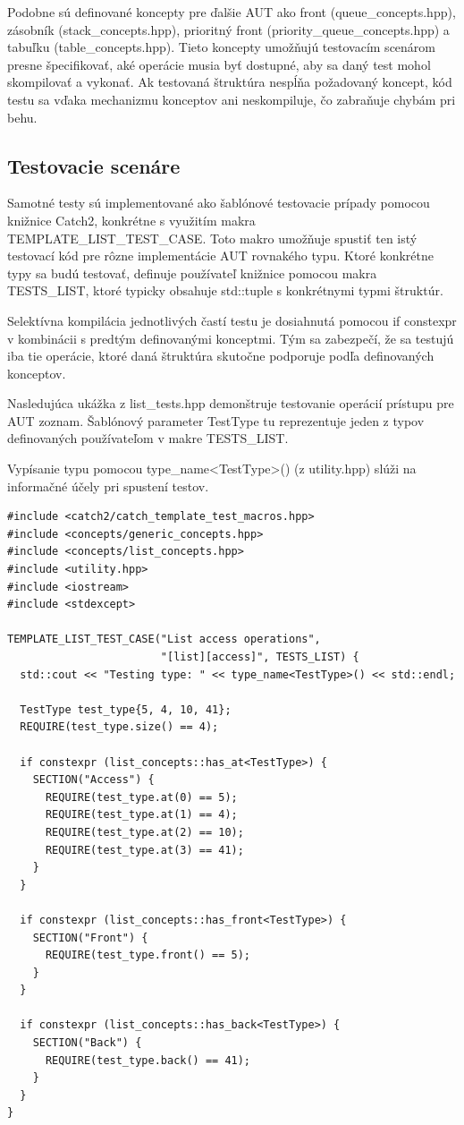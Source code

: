 \documentclass[11pt]{article}
\begin{document}
Podobne sú definované koncepty pre ďalšie AUT ako front (queue\_concepts.hpp), zásobník (stack\_concepts.hpp), prioritný front (priority\_queue\_concepts.hpp) a tabuľku (table\_concepts.hpp). Tieto koncepty umožňujú testovacím scenárom presne špecifikovať, aké operácie musia byť dostupné, aby sa daný test mohol skompilovať a vykonať. Ak testovaná štruktúra nespĺňa požadovaný koncept, kód testu sa vďaka mechanizmu konceptov ani neskompiluje, čo zabraňuje chybám pri behu.

\subsection{Testovacie scenáre}

Samotné testy sú implementované ako šablónové testovacie prípady pomocou knižnice Catch2, konkrétne s využitím makra TEMPLATE\_LIST\_TEST\_CASE. Toto makro umožňuje spustiť ten istý testovací kód pre rôzne implementácie AUT rovnakého typu. Ktoré konkrétne typy sa budú testovať, definuje používateľ knižnice pomocou makra TESTS\_LIST, ktoré typicky obsahuje std::tuple s konkrétnymi typmi štruktúr.

Selektívna kompilácia jednotlivých častí testu je dosiahnutá pomocou if constexpr v kombinácii s predtým definovanými konceptmi. Tým sa zabezpečí, že sa testujú iba tie operácie, ktoré daná štruktúra skutočne podporuje podľa definovaných konceptov.

Nasledujúca ukážka z list\_tests.hpp demonštruje testovanie operácií prístupu pre AUT zoznam. Šablónový parameter TestType tu reprezentuje jeden z typov definovaných používateľom v makre TESTS\_LIST.

Vypísanie typu pomocou type\_name<TestType>() (z utility.hpp) slúži na informačné účely pri spustení testov.

\begin{lstlisting}[caption={Ukážka testovacieho scenára pre Zoznam (list\_tests.hpp)}, label={lst:list_test_example}]
#include <catch2/catch_template_test_macros.hpp>
#include <concepts/generic_concepts.hpp>
#include <concepts/list_concepts.hpp>
#include <utility.hpp>
#include <iostream>
#include <stdexcept>

TEMPLATE_LIST_TEST_CASE("List access operations",
                        "[list][access]", TESTS_LIST) {
  std::cout << "Testing type: " << type_name<TestType>() << std::endl;

  TestType test_type{5, 4, 10, 41};
  REQUIRE(test_type.size() == 4);

  if constexpr (list_concepts::has_at<TestType>) {
    SECTION("Access") {
      REQUIRE(test_type.at(0) == 5);
      REQUIRE(test_type.at(1) == 4);
      REQUIRE(test_type.at(2) == 10);
      REQUIRE(test_type.at(3) == 41);
    }
  }

  if constexpr (list_concepts::has_front<TestType>) {
    SECTION("Front") {
      REQUIRE(test_type.front() == 5);
    }
  }

  if constexpr (list_concepts::has_back<TestType>) {
    SECTION("Back") {
      REQUIRE(test_type.back() == 41);
    }
  }
}
\end{lstlisting}
\end{document}
